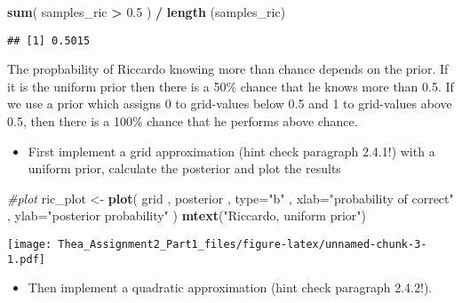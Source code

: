 \documentclass[]{article}
\newenvironment{Shaded}{\begin{snugshade}}{\end{snugshade}}
\newcommand{\KeywordTok}[1]{\textcolor[rgb]{0.13,0.29,0.53}{\textbf{#1}}}
\newcommand{\DataTypeTok}[1]{\textcolor[rgb]{0.13,0.29,0.53}{#1}}
\newcommand{\FloatTok}[1]{\textcolor[rgb]{0.00,0.00,0.81}{#1}}
\newcommand{\StringTok}[1]{\textcolor[rgb]{0.31,0.60,0.02}{#1}}
\newcommand{\CommentTok}[1]{\textcolor[rgb]{0.56,0.35,0.01}{\textit{#1}}}
\newcommand{\OperatorTok}[1]{\textcolor[rgb]{0.81,0.36,0.00}{\textbf{#1}}}
\newcommand{\NormalTok}[1]{#1}
\providecommand{\tightlist}{%
  \setlength{\itemsep}{0pt}\setlength{\parskip}{0pt}}
\begin{document}
\begin{Shaded}
\begin{Highlighting}[]
\KeywordTok{sum}\NormalTok{( samples_ric }\OperatorTok{>}\StringTok{ }\FloatTok{0.5}\NormalTok{ ) }\OperatorTok{/}\StringTok{ }\KeywordTok{length}\NormalTok{ (samples_ric) }
\end{Highlighting}
\end{Shaded}

\begin{verbatim}
## [1] 0.5015
\end{verbatim}

The propbability of Riccardo knowing more than chance depends on the
prior. If it is the uniform prior then there is a 50\% chance that he
knows more than 0.5. If we use a prior which assigns 0 to grid-values
below 0.5 and 1 to grid-values above 0.5, then there is a 100\% chance
that he performs above chance.

\begin{itemize}
\tightlist
\item
  First implement a grid approximation (hint check paragraph 2.4.1!)
  with a uniform prior, calculate the posterior and plot the results
\end{itemize}

\begin{Shaded}
\begin{Highlighting}[]
\CommentTok{#plot}
\NormalTok{ric_plot <-}\StringTok{ }\KeywordTok{plot}\NormalTok{( grid , posterior , }\DataTypeTok{type=}\StringTok{"b"}\NormalTok{ ,}
    \DataTypeTok{xlab=}\StringTok{"probability of correct"}\NormalTok{ , }\DataTypeTok{ylab=}\StringTok{"posterior probability"}\NormalTok{ )}
\KeywordTok{mtext}\NormalTok{(}\StringTok{"Riccardo, uniform prior"}\NormalTok{)}
\end{Highlighting}
\end{Shaded}

\texttt{[image: Thea\_Assignment2\_Part1\_files/figure-latex/unnamed-chunk-3-1.pdf]}

\begin{itemize}
\tightlist
\item
  Then implement a quadratic approximation (hint check paragraph
  2.4.2!).
\end{itemize}
\end{document}

